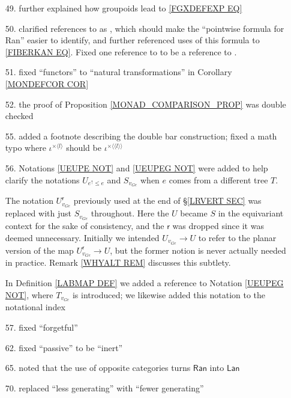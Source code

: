\documentclass{article}
\begin{document}
\begin{itemize}
\item[49.] further explained how groupoids lead to \eqref{FGXDEFEXP EQ}

\item[50.] clarified references to \cite[X.3.1]{McL} as \cite[X.3 Thm. 1]{McL}, which should make the ``pointwise formula for Ran'' easier to identify, and further referenced uses of this formula to \eqref{FIBERKAN EQ}.
Fixed one reference to \cite[X.3.1]{McL}
to be a reference to \cite[IX.3]{McL}.

\item[51.] fixed ``functors'' to ``natural transformations'' in Corollary \ref{MONDEFCOR COR}

\item[52.] the proof of Proposition \ref{MONAD_COMPARISON_PROP}
was double checked

\item[55.] added a footnote describing the double bar construction;
fixed a math typo where $\iota^{\times \langle l \rangle}$ should be 
$\iota^{\times \langle \langle l \rangle \rangle}$

\item[56.] 
Notations \ref{UEUPE NOT} and \ref{UEUPEG NOT}
were added to help clarify the notations
$U_{e^{\uparrow} \leq e}$
and
$S_{v_{Ge}}$
when $e$ comes from a different tree $T$.

The notation 
$U^{\mathsf{r}}_{v_{Ge}}$
previously used at the end of \S \ref{LRVERT SEC}
was replaced with just
$S_{v_{Ge}}$
throughout. Here the $U$ became $S$ in the equivariant context for the sake of consistency,
and the $\mathsf{r}$ was dropped since it was deemed unnecessary.
Initially we intended 
$U_{v_{Ge}} \to U$
to refer to the planar version of the map 
$U^{\mathsf{r}}_{v_{Ge}} \to U$,
but the former notion is never actually needed in practice.
Remark \ref{WHYALT REM} discusses this subtlety.

In Definition \ref{LABMAP DEF} we added a reference to
Notation \ref{UEUPEG NOT},
where $T_{v_{Ge}}$ is introduced;
we likewise added this notation to the notational index


\item[57.] fixed ``forgetful''

\item[62.] fixed ``passive'' to be ``inert''

\item[65.] noted that the use of opposite categories turns $\mathsf{Ran}$ into $\mathsf{Lan}$

\item[70.] replaced ``less generating'' with ``fewer generating''
      

\end{itemize}
\end{document}
